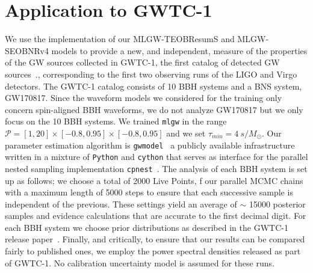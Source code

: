 \section{Application to GWTC-1}
\label{sec:GWTC1}
We use the implementation of our MLGW-TEOBResumS and MLGW-SEOBNRv4 models 
to provide a new, and independent, measure of the properties of the GW sources
collected in GWTC-1, the first catalog of detected GW sources~\cite{LIGOScientific:2018mvr}.,
corresponding to the first two observing runs of the LIGO and Virgo detectors.
The GWTC-1 catalog consists of 10 BBH systems and a BNS system, GW170817. 
Since the waveform models we considered for the training only concern spin-aligned
BBH waveforms, we do not analyze GW170817 but we only focus on the 10 BBH systems.
We trained \texttt{mlgw} in the range $\mathcal{P} = [1,20]\times[-0.8,0.95]\times[-0.8,0.95]$ 
and we set $\tau_{min} = \SI{4}{s/M_\odot}$.
Our parameter estimation algorithm is \texttt{gwmodel}~\cite{} a publicly available infrastructure 
written in a mixture of \texttt{Python} and \texttt{cython} that serves as interface for the parallel nested 
sampling implementation \texttt{cpnest}~\cite{}. 
The analysis of each BBH system is set up as follows; we choose a total of 2000 Live Points, f
our parallel MCMC chains with a maximum length of 5000 steps to ensure that each successive 
sample is independent of the previous. These settings yield an average of $\sim$ 15000 posterior samples and 
evidence calculations that are accurate to the first decimal digit. For each BBH system we choose 
prior distributions as described in the GWTC-1 release paper~\cite{LIGOScientific:2018mvr}. Finally, 
and critically, to ensure that our results can be compared fairly to published ones, 
we employ the power spectral densities released as part of GWTC-1. No calibration uncertainty model is assumed for these runs. 
